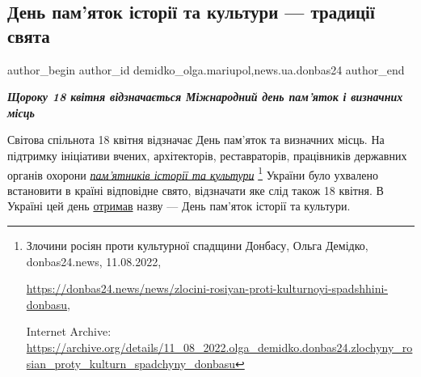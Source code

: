 
 
 
 
 
 
\subsection{День пам'яток історії та культури — традиції свята}
\label{sec:18_04_2023.stz.news.ua.donbas24.1.den_pamjatok_istorii_ta_kultury}
 
\ifcmt
 author_begin
   author_id demidko_olga.mariupol,news.ua.donbas24
 author_end
\fi

\vspace{1cm}
\vspace{0.5cm}
\begin{center}
  \em\color{blue}\bfseries\Large
Щороку 18 квітня відзначається Міжнародний день пам'яток і визначних місць  
\end{center}

Світова спільнота 18 квітня відзначає День пам'яток та визначних місць. На
підтримку ініціативи вчених, архітекторів, реставраторів, працівників державних
органів охорони \href{https://archive.org/details/11_08_2022.olga_demidko.donbas24.zlochyny_rosian_proty_kulturn_spadchyny_donbasu}{\emph{пам'ятників історії та культури}}%
\footnote{Злочини росіян проти культурної спадщини Донбасу, Ольга Демідко, donbas24.news, 11.08.2022, \par%
\url{https://donbas24.news/news/zlocini-rosiyan-proti-kulturnoyi-spadshhini-donbasu}, \par%
Internet Archive: \url{https://archive.org/details/11_08_2022.olga_demidko.donbas24.zlochyny_rosian_proty_kulturn_spadchyny_donbasu}%
} України було ухвалено встановити в країні відповідне свято, відзначати яке слід також 18 квітня. В
Україні цей день \href{https://mkip.gov.ua/news/7175.html}{отримав} назву — День пам'яток історії та культури.

